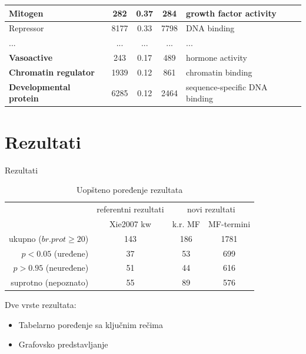 \documentclass{beamer}
\newcommand{\keyword}[1]{\textbf{#1}}
\begin{document}
\begin{frame}
\begin{tabular}{|p{4.2cm}|c|c|c|p{4.3cm}|}
    Mitogen                            & 282   & 0.37  & 284   & growth factor activity \\ \hline
    Repressor                          & 8177  & 0.33  & 7798  & DNA binding \\ \hline
    ... & ... & ... & ... &  ...\\
    \hline
    \keyword{Vasoactive}                            & 243   & 0.17  & 489   & hormone activity \\ \hline
    \keyword{Chromatin regulator}                   & 1939  & 0.12  & 861   & chromatin binding \\ \hline
    \keyword{Developmental protein}                 & 6285  & 0.12  & 2464  & sequence-specific DNA binding \\ \hline
  \end{tabular}

\end{frame}




\section{Rezultati}


\begin{frame}{Rezultati}

  \begin{table}[htpb]
    \centering
    \begin{tabular}{|r|c|c|c|}
      \hline
      & \small referentni rezultati   & \multicolumn{2}{c|}{ novi rezultati} \\
      & Xie2007 kw & k.r. MF  & MF-termini  \\
      \hline
      ukupno ($br. prot\ge20$)   & 143  & 186    & 1781          \\
      $p<0.05$ (uređene)         & 37   & 53     & 699           \\
      $p>0.95$ (neuređene)       & 51   & 44     & 616           \\
      suprotno (nepoznato)       & 55   & 89     & 576           \\
      \hline
    \end{tabular}
  \caption{Uopšteno poređenje rezultata}
  \end{table}

  \pause

  Dve vrste rezultata:
  \begin{itemize}
    \item Tabelarno poređenje sa ključnim rečima
    \item Grafovsko predstavljanje
  \end{itemize}

\end{frame}
\end{document}
